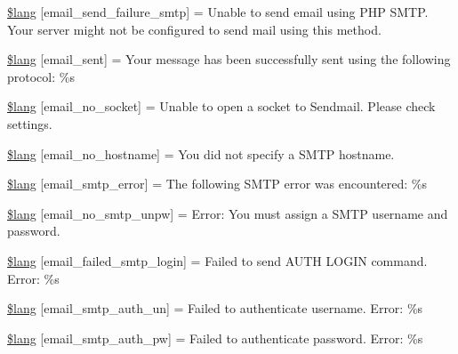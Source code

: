 \begin{DoxyCompactItemize}
\item 
\mbox{\hyperlink{email__lang_8php_a88dbb31ae1a6301c98c243040cdd3d31}{\$lang}} \mbox{[}\textquotesingle{}email\+\_\+send\+\_\+failure\+\_\+smtp\textquotesingle{}\mbox{]} = \textquotesingle{}Unable to send email using P\+HP S\+M\+T\+P. Your server might not be configured to send mail using this method.\textquotesingle{}
\item 
\mbox{\hyperlink{email__lang_8php_a5f0a9b6b5508f00c2e5f00ffc97f9de5}{\$lang}} \mbox{[}\textquotesingle{}email\+\_\+sent\textquotesingle{}\mbox{]} = \textquotesingle{}Your message has been successfully sent using the following protocol\+: \%s\textquotesingle{}
\item 
\mbox{\hyperlink{email__lang_8php_afb919754ca7b7a85e2558a0caa0505a0}{\$lang}} \mbox{[}\textquotesingle{}email\+\_\+no\+\_\+socket\textquotesingle{}\mbox{]} = \textquotesingle{}Unable to open a socket to Sendmail. Please check settings.\textquotesingle{}
\item 
\mbox{\hyperlink{email__lang_8php_a4c5e6092925ba771b996c0f982743e36}{\$lang}} \mbox{[}\textquotesingle{}email\+\_\+no\+\_\+hostname\textquotesingle{}\mbox{]} = \textquotesingle{}You did not specify a S\+M\+TP hostname.\textquotesingle{}
\item 
\mbox{\hyperlink{email__lang_8php_a1ba80ca4f0ed85bdeca37fae3db98b97}{\$lang}} \mbox{[}\textquotesingle{}email\+\_\+smtp\+\_\+error\textquotesingle{}\mbox{]} = \textquotesingle{}The following S\+M\+TP error was encountered\+: \%s\textquotesingle{}
\item 
\mbox{\hyperlink{email__lang_8php_a7df98b97e4450b50eece73b2bc0eab33}{\$lang}} \mbox{[}\textquotesingle{}email\+\_\+no\+\_\+smtp\+\_\+unpw\textquotesingle{}\mbox{]} = \textquotesingle{}Error\+: You must assign a S\+M\+TP username and password.\textquotesingle{}
\item 
\mbox{\hyperlink{email__lang_8php_a6d4cd89aad32dd6bb6bb8862524ed11a}{\$lang}} \mbox{[}\textquotesingle{}email\+\_\+failed\+\_\+smtp\+\_\+login\textquotesingle{}\mbox{]} = \textquotesingle{}Failed to send A\+U\+TH L\+O\+G\+IN command. Error\+: \%s\textquotesingle{}
\item 
\mbox{\hyperlink{email__lang_8php_a53ddef97a89f7bd19e8f7c0052dc2ac2}{\$lang}} \mbox{[}\textquotesingle{}email\+\_\+smtp\+\_\+auth\+\_\+un\textquotesingle{}\mbox{]} = \textquotesingle{}Failed to authenticate username. Error\+: \%s\textquotesingle{}
\item 
\mbox{\hyperlink{email__lang_8php_acdda9deb91e5e64499d4c834ea21f992}{\$lang}} \mbox{[}\textquotesingle{}email\+\_\+smtp\+\_\+auth\+\_\+pw\textquotesingle{}\mbox{]} = \textquotesingle{}Failed to authenticate password. Error\+: \%s\textquotesingle{}

\end{DoxyCompactItemize}
